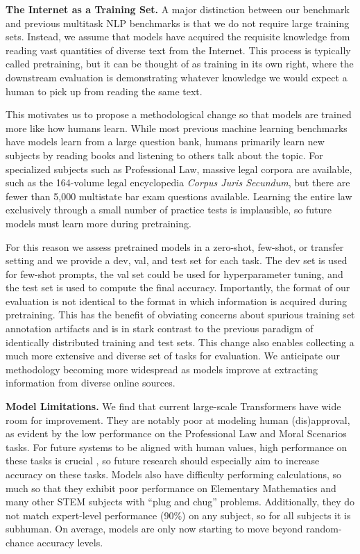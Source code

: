 \documentclass{article} \usepackage{iclr2021_conference, times}
\begin{document}
\noindent\textbf{The Internet as a Training Set.}\quad
A major distinction between our benchmark and previous multitask NLP benchmarks is that we do not require large training sets. Instead, we assume that models have acquired the requisite knowledge from reading vast quantities of diverse text from the Internet. This process is typically called pretraining, but it can be thought of as training in its own right, where the downstream evaluation is demonstrating whatever knowledge we would expect a human to pick up from reading the same text. 




This motivates us to propose a methodological change so that models are trained more like how humans learn.
While most previous machine learning benchmarks have models learn from a large question bank, humans primarily learn new subjects by reading books and listening to others talk about the topic. For specialized subjects such as Professional Law, massive legal corpora are available, such as the 164-volume legal encyclopedia \emph{Corpus Juris Secundum}, but there are fewer than 5,000 multistate bar exam questions available. Learning the entire law exclusively through a small number of practice tests is implausible, so future models must learn more during pretraining. 

For this reason we assess pretrained models in a zero-shot, few-shot, or transfer setting and we provide a dev, val, and test set for each task. The dev set is used for few-shot prompts, the val set could be used for hyperparameter tuning, and the test set is used to compute the final accuracy. Importantly, the format of our evaluation is not identical to the format in which information is acquired during pretraining. This has the benefit of obviating concerns about spurious training set annotation artifacts \citep{geirhos2020shortcut,Hendrycks2019NaturalAE} and is in stark contrast to the previous paradigm of identically distributed training and test sets. 
This change also enables collecting a much more extensive and diverse set of tasks for evaluation.
We anticipate our methodology becoming more widespread as models improve at extracting information from diverse online sources.





\noindent\textbf{Model Limitations.}\quad
We find that current large-scale Transformers have wide room for improvement. They are notably poor at modeling human (dis)approval, as evident by the low performance on the Professional Law and Moral Scenarios tasks. For future systems to be aligned with human values, high performance on these tasks is crucial \citep{hendrycks2020ethicsdataset}, so future research should especially aim to increase accuracy on these tasks. Models also have difficulty performing calculations, so much so that they exhibit poor performance on Elementary Mathematics and many other STEM subjects with ``plug and chug'' problems. Additionally, they do not match expert-level performance (90\%) on any subject, so for all subjects it is subhuman. On average, models are only now starting to move beyond random-chance accuracy levels.
\end{document}
